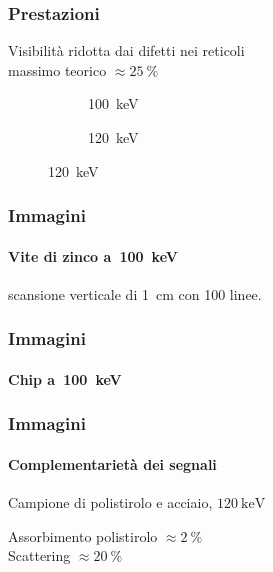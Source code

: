 \documentclass[italian]{beamer}
\begin{document}
\begin{frame}
    \frametitle{Prestazioni}
    Visibilit\`a ridotta dai difetti nei reticoli\\
    massimo teorico $\approx \SI{25}{\percent}$
    \begin{figure}[h!]
        \centering
        \begin{subfigure}[b]{.49\textwidth}
            \resizebox{\textwidth}{!}{}
            \caption{\SI{100}{\kilo\eV}}
        \end{subfigure}
        \begin{subfigure}[b]{.49\textwidth}
            \resizebox{\textwidth}{!}{}
            \caption{\SI{120}{\kilo\eV}}
        \end{subfigure}
    \end{figure}
\end{frame}

\begin{frame}
    \frametitle{Immagini}
    \framesubtitle{Vite di zinco a~\SI{100}{\kilo\eV}}
 scansione verticale di \SI{1}{\centi\metre} con \num{100} linee.
    \begin{figure}[hbt]
        \centering
        \resizebox{.5\textwidth}{!}{}
    \end{figure}
\end{frame}
\begin{frame}
    \frametitle{Immagini}
    \framesubtitle{Chip a~\SI{100}{\kilo\eV}}
    \begin{figure}[hbt]
        \centering
        \resizebox{.45\textwidth}{!}{}
    \end{figure}
\end{frame}

\begin{frame}
    \frametitle{Immagini}
    \framesubtitle{Complementariet\`a dei segnali}
    Campione di polistirolo e acciaio, $\SI{120}{\kilo\eV}$
    \begin{figure}[h!]
        \centering
        \begin{subfigure}[b]{.49\textwidth}
            \resizebox{\textwidth}{!}{}
        \end{subfigure}
        \begin{subfigure}[b]{.49\textwidth}
        \end{subfigure}
    \end{figure}
    Assorbimento polistirolo $\approx \SI{2}{\percent}$\\
    Scattering $\approx \SI{20}{\percent}$
\end{frame}
\end{document}

